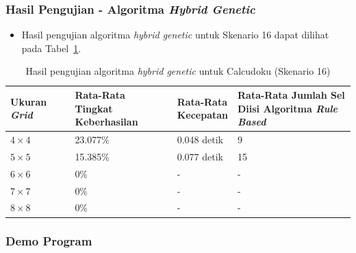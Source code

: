 \documentclass{beamer}
\begin{document}
\begin{frame}
\frametitle{Hasil Pengujian - Algoritma \textit{Hybrid Genetic}}
\begin{itemize}
\item Hasil pengujian algoritma \textit{hybrid genetic} untuk Skenario 16 dapat dilihat pada Tabel~\ref{tab:pengujianhg16}.
\end{itemize}
\begin{table}
\tiny
\centering
\captionsetup{justification=centering}
\caption[Hasil pengujian algoritma \textit{hybrid genetic} untuk Calcudoku (Skenario 16)]{Hasil pengujian algoritma \textit{hybrid genetic} untuk Calcudoku (Skenario 16)}
\begin{tabular}{| l | l | l | l |}
\hline
Ukuran \textit{Grid} & \makecell[c]{Rata-Rata \\ Tingkat Keberhasilan} & \makecell[c]{Rata-Rata \\ Kecepatan} & \makecell[c]{Rata-Rata Jumlah Sel \\ Diisi Algoritma \textit{Rule Based}} \\
\hline \hline
\begin{math}4 \times 4\end{math} & 23.077\% & 0.048 detik & 9 \\
\hline
\begin{math}5 \times 5\end{math} & 15.385\% & 0.077 detik & 15 \\
\hline
\begin{math}6 \times 6\end{math} & 0\% & - & - \\
\hline
\begin{math}7 \times 7\end{math} & 0\% & - & - \\
\hline
\begin{math}8 \times 8\end{math} & 0\% & - & - \\
\hline
\end{tabular}
\label{tab:pengujianhg16}
\end{table}
\end{frame}


\begin{frame}
\frametitle{Demo Program}
\end{frame}
\end{document}

